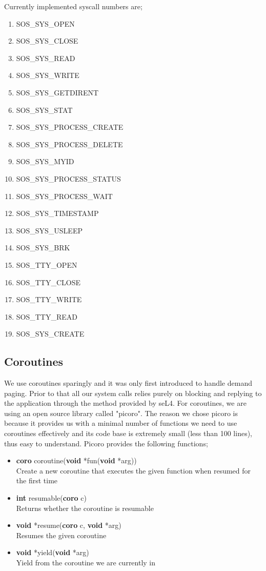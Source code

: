 \documentclass[12pt]{article}
\begin{document}
Currently implemented syscall numbers are;
\begin{enumerate}
\item SOS\_SYS\_OPEN
\item SOS\_SYS\_CLOSE
\item SOS\_SYS\_READ
\item SOS\_SYS\_WRITE
\item SOS\_SYS\_GETDIRENT
\item SOS\_SYS\_STAT
\item SOS\_SYS\_PROCESS\_CREATE
\item SOS\_SYS\_PROCESS\_DELETE
\item SOS\_SYS\_MYID
\item SOS\_SYS\_PROCESS\_STATUS
\item SOS\_SYS\_PROCESS\_WAIT
\item SOS\_SYS\_TIMESTAMP
\item SOS\_SYS\_USLEEP
\item SOS\_SYS\_BRK
\item SOS\_TTY\_OPEN
\item SOS\_TTY\_CLOSE
\item SOS\_TTY\_WRITE
\item SOS\_TTY\_READ
\item SOS\_SYS\_CREATE
\end{enumerate}

\subsection{Coroutines}
We use coroutines sparingly and it was only first introduced to handle demand paging. Prior to that all our system calls relies purely on blocking and replying to the application through the method provided by seL4.
For coroutines, we are using an open source library called "picoro". The reason we chose picoro is because it provides us with a minimal number of functions we need to use coroutines effectively and its code base is extremely small (less than 100 lines), thus easy to understand. Picoro provides the following functions;
\begin{itemize}
\item \textbf{coro} coroutine(\textbf{void} *fun(\textbf{void} *arg))\\
Create a new coroutine that executes the given function when resumed for the first time
\item \textbf{int} resumable(\textbf{coro} c)\\
Returns whether the coroutine is resumable
\item \textbf{void} *resume(\textbf{coro} c, \textbf{void} *arg)\\
Resumes the given coroutine
\item \textbf{void} *yield(\textbf{void} *arg)\\
Yield from the coroutine we are currently in
\end{itemize}
\end{document}
